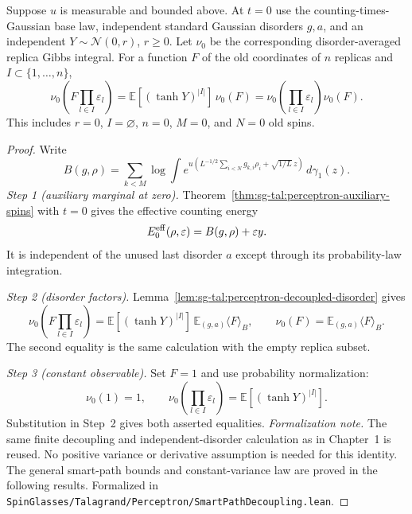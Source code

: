 \begin{theorem}\label{thm:sg-tal:perceptron-decoupled-endpoint}
  \leanok
Suppose $u$ is measurable and bounded above. At $t=0$ use the counting-times-Gaussian base law,
independent standard Gaussian disorders $g,a$, and an independent $Y\sim\mathcal N(0,r)$, $r\ge0$.
Let $\nu_0$ be the corresponding disorder-averaged replica Gibbs integral. For a function $F$
of the old coordinates of $n$ replicas and $I\subset\{1,\ldots,n\}$,
\[
 \nu_0\left(F\prod_{l\in I}\varepsilon_l\right)
 =\mathbb E[(\tanh Y)^{|I|}]\,\nu_0(F)
 =\nu_0\left(\prod_{l\in I}\varepsilon_l\right)\nu_0(F).
\]
This includes $r=0$, $I=\varnothing$, $n=0$, $M=0$, and $N=0$ old spins.
\end{theorem}
\begin{proof}
  \leanok
Write
\[
 B(g,\rho)=\sum_{k<M}\log\int
 e^{u(L^{-1/2}\sum_{i<N}g_{k,i}\rho_i+\sqrt{1/L}\,z)}\,d\gamma_1(z).
\]
\emph{Step 1 (auxiliary marginal at zero).} Theorem~\ref{thm:sg-tal:perceptron-auxiliary-spins}
with $t=0$ gives the effective counting energy
\[
 E_0^{\rm eff}(\rho,\varepsilon)=B(g,\rho)+\varepsilon y.
\]
It is independent of the unused last disorder $a$ except through its probability-law integration.

\emph{Step 2 (disorder factors).} Lemma~\ref{lem:sg-tal:perceptron-decoupled-disorder} gives
\[
 \nu_0\left(F\prod_{l\in I}\varepsilon_l\right)
 =\mathbb E[(\tanh Y)^{|I|}]\,\mathbb E_{(g,a)}\langle F\rangle_B,
 \qquad \nu_0(F)=\mathbb E_{(g,a)}\langle F\rangle_B.
\]
The second equality is the same calculation with the empty replica subset.

\emph{Step 3 (constant observable).} Set $F=1$ and use probability normalization:
\[
 \nu_0(1)=1,\qquad
 \nu_0\left(\prod_{l\in I}\varepsilon_l\right)=\mathbb E[(\tanh Y)^{|I|}].
\]
Substitution in Step~2 gives both asserted equalities.
\emph{Formalization note.} The same finite decoupling and independent-disorder calculation as in
Chapter~1 is reused. No positive variance or derivative assumption is needed for this identity.
The general smart-path bounds and constant-variance law are proved in the following results.
Formalized in \texttt{SpinGlasses/Talagrand/Perceptron/SmartPathDecoupling.lean}.
\end{proof}


